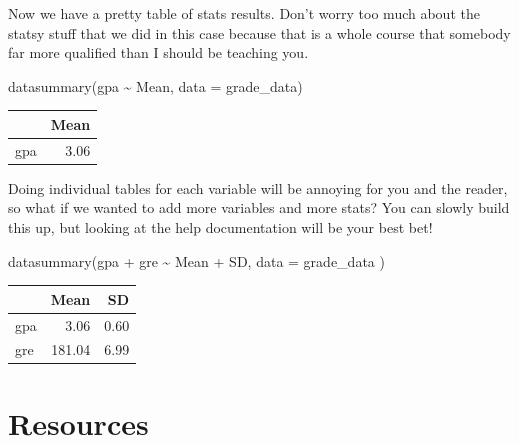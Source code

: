 \documentclass[]{tufte-handout}
\newenvironment{Shaded}{}{}
\newcommand{\AttributeTok}[1]{\textcolor[rgb]{0.49,0.56,0.16}{#1}}
\newcommand{\FunctionTok}[1]{\textcolor[rgb]{0.02,0.16,0.49}{#1}}
\newcommand{\NormalTok}[1]{#1}
\newcommand{\SpecialCharTok}[1]{\textcolor[rgb]{0.25,0.44,0.63}{#1}}
\begin{document}
Now we have a pretty table of stats results. Don't worry too much about
the statsy stuff that we did in this case because that is a whole course
that somebody far more qualified than I should be teaching you.

\begin{Shaded}
\begin{Highlighting}[]
\FunctionTok{datasummary}\NormalTok{(gpa }\SpecialCharTok{\textasciitilde{}}\NormalTok{ Mean, }\AttributeTok{data =}\NormalTok{ grade\_data)}
\end{Highlighting}
\end{Shaded}

\begin{table}
\centering
\begin{tabular}[t]{lr}
\toprule
  & Mean\\
\midrule
gpa & \num{3.06}\\
\bottomrule
\end{tabular}
\end{table}

Doing individual tables for each variable will be annoying for you and
the reader, so what if we wanted to add more variables and more stats?
You can slowly build this up, but looking at the help documentation will
be your best bet!

\begin{Shaded}
\begin{Highlighting}[]
\FunctionTok{datasummary}\NormalTok{(gpa }\SpecialCharTok{+}\NormalTok{ gre }\SpecialCharTok{\textasciitilde{}}\NormalTok{ Mean }\SpecialCharTok{+}\NormalTok{ SD,}
  \AttributeTok{data =}\NormalTok{ grade\_data}
\NormalTok{)}
\end{Highlighting}
\end{Shaded}

\begin{table}
\centering
\begin{tabular}[t]{lrr}
\toprule
  & Mean & SD\\
\midrule
gpa & \num{3.06} & \num{0.60}\\
gre & \num{181.04} & \num{6.99}\\
\bottomrule
\end{tabular}
\end{table}

\hypertarget{resources}{%
\section{Resources}\label{resources}}
\end{document}
